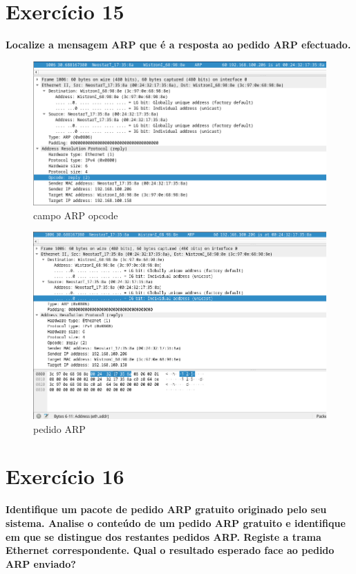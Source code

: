 \documentclass[a4paper]{report}
\begin{document}
\section{Exercício 15}
\textbf{Localize a mensagem ARP que é a resposta ao pedido ARP efectuado.}

\begin{figure}[H]
    \centering 
    \includegraphics[width=\textwidth]{images/ex15a.png}
    \caption{campo ARP opcode}
    \label{fig:ex15a}
\end{figure}

\begin{figure}[H]
    \centering 
    \includegraphics[width=\textwidth]{images/ex15b.png}
    \caption{pedido ARP}
    \label{fig:ex15b}
\end{figure}

\section{Exercício 16}
\textbf{Identifique um pacote de pedido ARP gratuito originado pelo seu sistema.
Analise o conteúdo de um pedido ARP gratuito e identifique em que se distingue
dos restantes pedidos ARP. Registe a trama Ethernet correspondente. Qual o
resultado esperado face ao pedido ARP enviado?}
\end{document}
